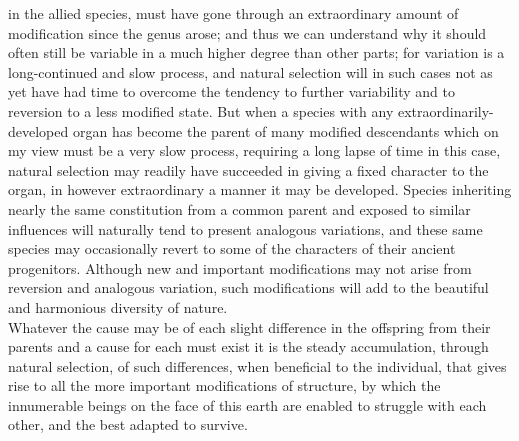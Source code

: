 in the allied species, must have gone through an extraordinary amount of modification since the genus arose; and thus we can understand why it should often still be variable in a much higher degree than other parts; for variation is a long-continued and slow process, and natural selection will in such cases not as yet have had time to overcome the tendency to further variability and to reversion to a less modified state. But when a species with any extraordinarily-developed organ has become the parent of many modified descendants which on my view must be a very slow process, requiring a long lapse of time in this case, natural selection may readily have succeeded in giving a fixed character to the organ, in however extraordinary a manner it may be developed. Species inheriting nearly the same constitution from a common parent and exposed to similar influences will naturally tend to present analogous variations, and these same species may occasionally revert to some of the characters of their ancient progenitors. Although new and important modifications may not arise from reversion and analogous variation, such modifications will add to the beautiful and harmonious diversity of nature.\\
\indent Whatever the cause may be of each slight difference in the offspring from their parents and a cause for each must exist it is the steady accumulation, through natural selection, of such differences, when beneficial to the individual, that gives rise to all the more important modifications of structure, by which the innumerable beings on the face of this earth are enabled to struggle with each other, and the best adapted to survive.